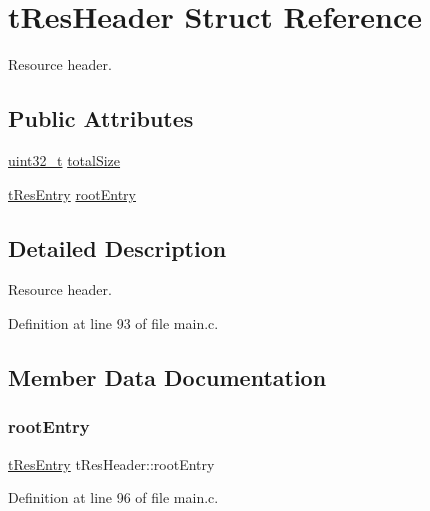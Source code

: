 \hypertarget{structtResHeader}{}\section{t\+Res\+Header Struct Reference}
\label{structtResHeader}


Resource header.  


\subsection*{Public Attributes}
\begin{DoxyCompactItemize}
\item 
\hyperlink{stdint_8h_a435d1572bf3f880d55459d9805097f62}{uint32\+\_\+t} \hyperlink{structtResHeader_a902608e1b86415839e6441e1021c60b5}{total\+Size}
\item 
\hyperlink{structtResEntry}{t\+Res\+Entry} \hyperlink{structtResHeader_a4b77f1300b97d87e79d894befb92944c}{root\+Entry}
\end{DoxyCompactItemize}


\subsection{Detailed Description}
Resource header. 

Definition at line 93 of file main.\+c.



\subsection{Member Data Documentation}
\mbox{\label{structtResHeader_a4b77f1300b97d87e79d894befb92944c}} 
\subsubsection{\texorpdfstring{root\+Entry}{rootEntry}}
{\footnotesize\ttfamily \hyperlink{structtResEntry}{t\+Res\+Entry} t\+Res\+Header\+::root\+Entry}



Definition at line 96 of file main.\+c.

\mbox{\label{structtResHeader_a902608e1b86415839e6441e1021c60b5}} 
